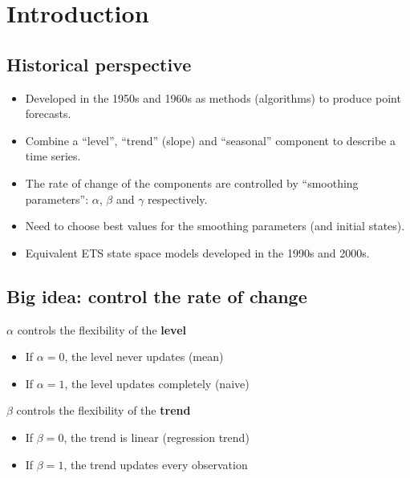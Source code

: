 \documentclass[]{book}
\providecommand{\tightlist}{%
  \setlength{\itemsep}{0pt}\setlength{\parskip}{0pt}}
\begin{document}

\hypertarget{introduction}{%
\section{Introduction}\label{introduction}}

\hypertarget{historical-perspective}{%
\subsection{Historical perspective}\label{historical-perspective}}

\begin{itemize}
\tightlist
\item
  Developed in the 1950s and 1960s as methods (algorithms) to produce point forecasts.
\item
  Combine a ``level'', ``trend'' (slope) and ``seasonal'' component to describe a time series.
\item
  The rate of change of the components are controlled by ``smoothing parameters'': \(\alpha\), \(\beta\) and \(\gamma\) respectively.
\item
  Need to choose best values for the smoothing parameters (and initial states).
\item
  Equivalent ETS state space models developed in the 1990s and 2000s.
\end{itemize}

\hypertarget{big-idea-control-the-rate-of-change}{%
\subsection{Big idea: control the rate of change}\label{big-idea-control-the-rate-of-change}}

\(\alpha\) controls the flexibility of the \textbf{level}

\begin{itemize}
\tightlist
\item
  If \(\alpha = 0\), the level never updates (mean)
\item
  If \(\alpha = 1\), the level updates completely (naive)
\end{itemize}

\(\beta\) controls the flexibility of the \textbf{trend}

\begin{itemize}
\tightlist
\item
  If \(\beta = 0\), the trend is linear (regression trend)
\item
  If \(\beta = 1\), the trend updates every observation
\end{itemize}
\end{document}
